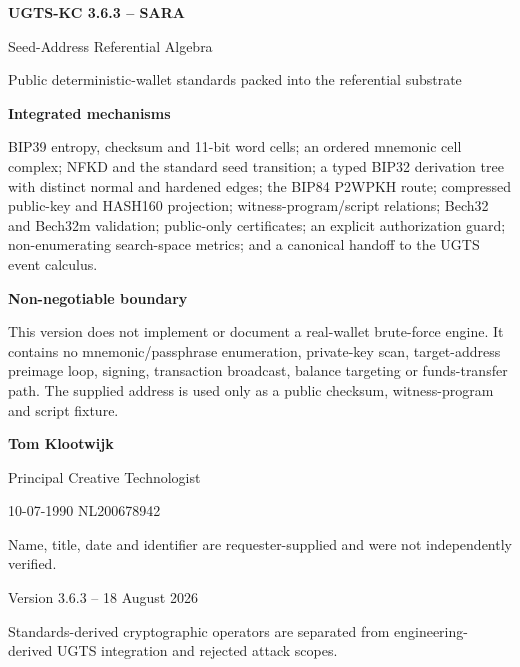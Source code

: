 \documentclass[10pt,a4paper]{article}
\begin{document}

\begin{titlepage}
\pagecolor{UGTSNavy}
\color{white}
\vspace*{8mm}
{\sffamily\bfseries\fontsize{34}{39}\selectfont UGTS-KC 3.6.3 -- SARA\par}
\vspace{4mm}
{\sffamily\fontsize{21}{25}\selectfont Seed-Address Referential Algebra\par}
\vspace{6mm}
{\sffamily\large Public deterministic-wallet standards packed into the referential substrate\par}
\vspace{11mm}

\begin{tcolorbox}[enhanced,colback=white,colframe=UGTSTeal,boxrule=1.2pt,arc=2mm,left=5mm,right=5mm,top=4mm,bottom=4mm]
\color{UGTSDark}
\textbf{Integrated mechanisms}\par
BIP39 entropy, checksum and 11-bit word cells; an ordered mnemonic cell complex; NFKD and the standard seed transition; a typed BIP32 derivation tree with distinct normal and hardened edges; the BIP84 P2WPKH route; compressed public-key and HASH160 projection; witness-program/script relations; Bech32 and Bech32m validation; public-only certificates; an explicit authorization guard; non-enumerating search-space metrics; and a canonical handoff to the UGTS event calculus.
\end{tcolorbox}

\vspace{6mm}
\begin{tcolorbox}[enhanced,colback=UGTSRedLight,colframe=UGTSCoral,boxrule=1.1pt,arc=2mm,left=5mm,right=5mm,top=3.5mm,bottom=3.5mm]
\color{UGTSDark}
\textbf{Non-negotiable boundary}\par
This version does not implement or document a real-wallet brute-force engine. It contains no mnemonic/passphrase enumeration, private-key scan, target-address preimage loop, signing, transaction broadcast, balance targeting or funds-transfer path. The supplied address is used only as a public checksum, witness-program and script fixture.
\end{tcolorbox}

\vfill
{\sffamily\Large\bfseries Tom Klootwijk\par}
{\sffamily\large Principal Creative Technologist\par}
{\sffamily\large 10-07-1990 \quad NL200678942\par}
\vspace{3mm}
{\sffamily\small Name, title, date and identifier are requester-supplied and were not independently verified.\par}
\vspace{9mm}
{\sffamily\small Version 3.6.3 -- 18 August 2026\par}
{\sffamily\small Standards-derived cryptographic operators are separated from engineering-derived UGTS integration and rejected attack scopes.\par}
\end{titlepage}
\nopagecolor
\color{UGTSDark}
\end{document}
